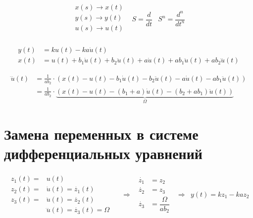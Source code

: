 \documentclass[a4paper, 12pt]{article}
\begin{document}
\vspace{1cm}

$$
    \begin{matrix}
        \begin{matrix}
            x(s) \to x(t) \\
            y(s) \to y(t) \\
            u(s) \to u(t) \\
        \end{matrix}
        &
        S = \dfrac{d}{dt}
        &
        S^n = \dfrac{d^n}{dt^n}
    \end{matrix}
$$

\vspace{1cm}

$$
    \begin{aligned}
        y(t) &= ku(t) - ka\dot{u}(t)
        \\
        x(t) &= u(t) + b_1\dot{u}(t) + b_2\ddot{u}(t) + a\dot{u}(t) + ab_1\ddot{u}(t) + ab_2\dddot{u}(t)
    \end{aligned}
$$

\vspace{1cm}

$$
    \begin{aligned}
        \dddot{u}(t)
        &= \frac{1}{ab_2} \cdot (x(t) - u(t) - b_1\dot{u}(t) - b_2\ddot{u}(t) - a\dot{u}(t) - ab_1\ddot{u}(t))
        \\
        &= \frac{1}{ab_2} \cdot \underbrace{(x(t) - u(t) - (b_1 + a)\dot{u}(t) - (b_2 + ab_1)\ddot{u}(t))}_{\Omega}
    \end{aligned}
$$

\section{Замена переменных в системе дифференциальных уравнений}
$$
    \begin{matrix}
        \begin{aligned}
            z_1(t) = &u(t) &
            \\
            z_2(t) = &\dot{u}(t) = \dot{z_1}(t) &
            \\
            z_3(t) = &\ddot{u}(t) = \dot{z_2}(t) &
            \\
            &\dddot{u}(t) = \dot{z_3}(t) = \Omega &
        \end{aligned}
        &
        \Rightarrow
        &
        \begin{aligned}
            \dot{z_1} &= z_2
            \\
            \dot{z_2} &= z_3
            \\
            \dot{z_3} &= \dfrac{\Omega}{ab_2}
        \end{aligned}
        &
        \Rightarrow
        &
        y(t) = kz_1 - kaz_2
    \end{matrix}
$$
\end{document}

